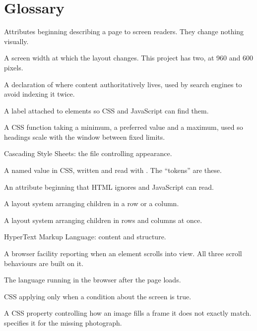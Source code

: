 \documentclass[11pt,a4paper]{article}
\begin{document}
\section{Glossary}

\begin{description}[leftmargin=0pt,style=nextline]
\item[ARIA] Attributes beginning  describing a page to screen readers.
  They change nothing visually.
\item[Breakpoint] A screen width at which the layout changes. This project has two,
  at 960 and 600 pixels.
\item[Canonical URL] A declaration of where content authoritatively lives, used by
  search engines to avoid indexing it twice.
\item[Class] A label attached to elements so CSS and JavaScript can find them.
\item[clamp] A CSS function taking a minimum, a preferred value and a maximum, used
  so headings scale with the window between fixed limits.
\item[CSS] Cascading Style Sheets: the file controlling appearance.
\item[Custom property] A named value in CSS, written  and read with
  . The ``tokens'' are these.
\item[Data attribute] An attribute beginning  that HTML ignores and
  JavaScript can read.
\item[Flexbox] A layout system arranging children in a row or a column.
\item[Grid] A layout system arranging children in rows and columns at once.
\item[HTML] HyperText Markup Language: content and structure.
\item[IntersectionObserver] A browser facility reporting when an element scrolls
  into view. All three scroll behaviours are built on it.
\item[JavaScript] The language running in the browser after the page loads.
\item[Media query] CSS applying only when a condition about the screen is true.
\item[object-fit] A CSS property controlling how an image fills a frame it does not
  exactly match.  specifies it for the missing photograph.

\end{description}
\end{document}
